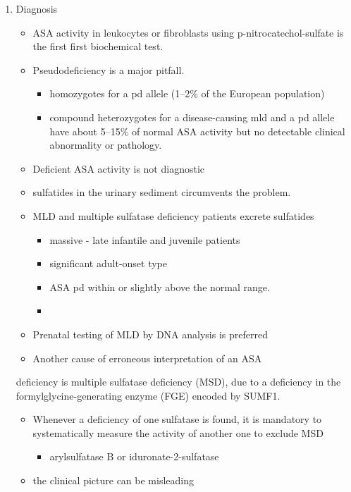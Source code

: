 \documentclass{scrartcl}
\begin{document}
\begin{enumerate}
\item Diagnosis
\label{sec:org2bbbbd2}

\begin{itemize}
\item ASA activity in leukocytes or fibroblasts using p-nitrocatechol-sulfate is the first first biochemical test.
\item Pseudodeficiency is a major pitfall.
\begin{itemize}
\item homozygotes for a pd allele (1–2\% of the European population)
\item compound heterozygotes for a disease-causing mld and a pd allele
have about 5–15\% of normal ASA activity but no detectable clinical
abnormality or pathology.
\end{itemize}
\item Deficient ASA activity is not diagnostic
\item sulfatides in the urinary sediment circumvents the problem.
\item MLD and multiple sulfatase deficiency patients excrete sulfatides
\begin{itemize}
\item massive - late infantile and juvenile patients
\item significant adult-onset type
\item ASA pd within or slightly above the normal range.
\item 
\end{itemize}
\item Prenatal testing of MLD by DNA analysis is preferred

\item Another cause of erroneous interpretation of an ASA
\end{itemize}
deficiency is multiple sulfatase deficiency (MSD), due to a
deficiency in the formylglycine-generating enzyme (FGE)
encoded by SUMF1. 

\begin{itemize}
\item Whenever a deficiency of one sulfatase is found, it is mandatory to
systematically measure the activity of another one to exclude MSD
\begin{itemize}
\item arylsulfatase B or iduronate-2-sulfatase
\end{itemize}
\item the clinical picture can be misleading


\end{itemize}
\end{enumerate}
\end{document}
